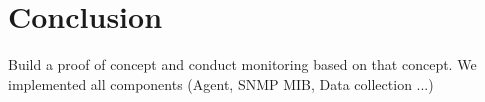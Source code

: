 \section{Conclusion}
\label{chap:conclusion}

Build a proof of concept and conduct monitoring based on that concept. We implemented all components (Agent, SNMP MIB, Data collection ...)


